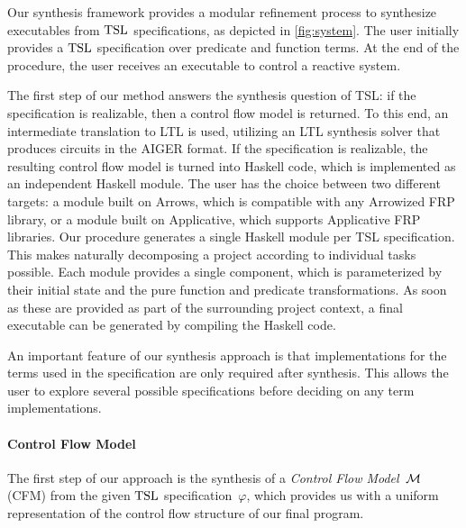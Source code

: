 Our synthesis framework provides a modular refinement process
to synthesize executables from $ \text{TSL} $ specifications, as depicted
in \cref{fig:system}. The user initially provides a
$ \text{TSL} $ specification over predicate and function terms.  At the end
of the procedure, the user receives an executable to control a
reactive system.

The first step of our method answers the synthesis question of TSL: if
the specification is realizable, then a control flow model is
returned.  To this end, an intermediate translation to LTL is used,
utilizing an LTL synthesis solver that produces circuits in the AIGER
format. If the specification is realizable, the resulting control flow
model is turned into Haskell code, which is implemented as an
independent Haskell module. The user has the choice between two
different targets: a module built on Arrows, which is compatible with
any Arrowized FRP library, or a module built on Applicative, which
supports Applicative FRP \mbox{libraries}. Our procedure generates a single
Haskell module per TSL specification. This makes naturally decomposing
a project according to individual tasks possible. Each module provides
a single component, which is parameterized by their initial state and
the pure function and predicate transformations. As soon as these are
provided as part of the surrounding project context, a final
executable can be generated by compiling the Haskell code.

An important feature of our synthesis approach is that implementations
for the terms used in the specification are only required after
synthesis.  This allows the user to explore several possible
specifications before deciding on any term implementations.

\paragraph{Control Flow Model} The first step of our approach is the
synthesis of a \textit{Control Flow Model}~$ \mathcal{M} $ (CFM) from the
given $ \text{TSL} $ specification~$ \varphi $, which provides us with a
uniform representation of the control flow structure of our final
program.

